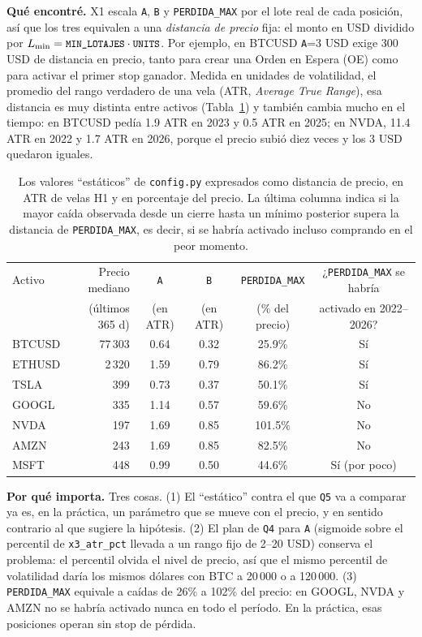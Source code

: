 \documentclass[11pt,a4paper]{article}
\newcommand{\code}[1]{\texttt{\small #1}}
\begin{document}
\textbf{Qué encontré.} X1 escala \code{A}, \code{B} y \code{PERDIDA\_MAX} por el lote real de cada
posición, así que los tres equivalen a una \emph{distancia de precio} fija: el monto en USD dividido por
$L_{\min} = \code{MIN\_LOTAJES}\cdot\code{UNITS}$. Por ejemplo, en BTCUSD \code{A}=3 USD exige 300 USD de
distancia en precio, tanto para crear una Orden en Espera (OE) como para activar el primer stop ganador.
Medida en unidades de volatilidad, el promedio del rango verdadero de una vela (ATR, \emph{Average True
Range}), esa distancia es muy distinta entre activos (Tabla~\ref{tab:unidades}) y también cambia mucho en
el tiempo: en BTCUSD pedía 1.9 ATR en 2023 y 0.5 ATR en 2025; en NVDA, 11.4 ATR en 2022 y 1.7 ATR en
2026, porque el precio subió diez veces y los 3 USD quedaron iguales.

\begin{table}[h]
\centering\small
\begin{tabular}{lrcccc}
\toprule
Activo & Precio mediano & \code{A} & \code{B} & \code{PERDIDA\_MAX} & ¿\code{PERDIDA\_MAX} se habría \\
       & (últimos 365 d) & (en ATR) & (en ATR) & (\% del precio) & activado en 2022--2026? \\
\midrule
BTCUSD & 77\,303 & 0.64 & 0.32 & 25.9\% & Sí \\
ETHUSD & 2\,320 & 1.59 & 0.79 & 86.2\% & Sí \\
TSLA   & 399 & 0.73 & 0.37 & 50.1\% & Sí \\
GOOGL  & 335 & 1.14 & 0.57 & 59.6\% & No \\
NVDA   & 197 & 1.69 & 0.85 & 101.5\% & No \\
AMZN   & 243 & 1.69 & 0.85 & 82.5\% & No \\
MSFT   & 448 & 0.99 & 0.50 & 44.6\% & Sí (por poco) \\
\bottomrule
\end{tabular}
\caption{Los valores ``estáticos'' de \code{config.py} expresados como distancia de precio, en ATR de
velas H1 y en porcentaje del precio. La última columna indica si la mayor caída observada desde un cierre
hasta un mínimo posterior supera la distancia de \code{PERDIDA\_MAX}, es decir, si se habría activado
incluso comprando en el peor momento.}
\label{tab:unidades}
\end{table}

\textbf{Por qué importa.} Tres cosas. (1) El ``estático'' contra el que \code{Q5} va a comparar ya es,
en la práctica, un parámetro que se mueve con el precio, y en sentido contrario al que sugiere la
hipótesis. (2) El plan de \code{Q4} para \code{A} (sigmoide sobre el percentil de \code{x3\_atr\_pct}
llevada a un rango fijo de 2--20 USD) conserva el problema: el percentil olvida el nivel de precio, así
que el mismo percentil de volatilidad daría los mismos dólares con BTC a 20\,000 o a 120\,000.
(3) \code{PERDIDA\_MAX} equivale a caídas de 26\% a 102\% del precio: en GOOGL, NVDA y AMZN no se habría
activado nunca en todo el período. En la práctica, esas posiciones operan sin stop de pérdida.
\end{document}
